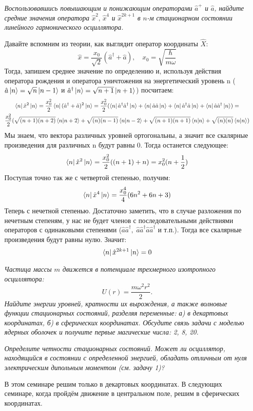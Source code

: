 \begin{center}
    \textit{Воспользовавшись повышающим и понижающим операторами $\hat a^+$ и $\hat a$, найдите средние значения оператора $\hat x^2,\,
    \hat x^4$ и $\hat x^{2k+1}$ в $n$-м стационарном состоянии линейного гармонического осциллятора.}
\end{center}
Давайте вспомним из теории, как выглядит оператор координаты $\hat X$: 
\[
\hat x = \frac{x_0}{\sqrt{2}}(\hat a^{\dagger} + \hat a),\quad x_0 = \sqrt{\frac{\hbar}{m\omega}}
\]
Тогда, запишем среднее значение по определению и, используя действия оператора рождения и оператора уничтожения на энергетический уровень n ($\hat a\ket{n} = \sqrt{n}\ket{n-1}$ и $\hat{a}^{\dagger}\ket{n} = \sqrt{n+1}\ket{n+1}$) посчитаем:
\begin{multline*}
    \bra{n}\hat x^2 \ket{n} = \frac{x^2_0}{2}\bra{n}(\hat a^{\dagger} + \hat a)^2\ket{n} = \frac{x^2_0}{2}(\bra{n}\hat a^{\dagger}\hat a^{\dagger}\ket{n} +\bra{n}\hat a\hat a\ket{n} + \bra{n}\hat a^{\dagger}\hat a\ket{n} + \bra{n}\hat a\hat a^{\dagger}\ket{n}) =\\
    \frac{x^2_0}{2}(\sqrt{(n+1)(n+2)}\bra{n}\ket{n+2} + \sqrt{(n)(n-1)}\bra{n}\ket{n-2} + \sqrt{(n+1)(n+1)}\bra{n}\ket{n} + \sqrt{(n) (n)}\bra{n}\ket{n})
\end{multline*}
Мы знаем, что вектора различных уровней ортогональны, а значит все скалярные произведения для различных n будут равны 0. Тогда останется следующее:
\[
\bra{n}\hat x^2\ket{n} = \frac{x^2_0}{2}((n+1) + n) = x^2_0(n + \frac{1}{2})
\]
Поступая точно так же с четвертой степенью, получим:
\[
\bra{n}\hat x^4\ket{n} = \frac{x_0^4}{4}(6n^2 + 6n + 3)
\]
Теперь с нечетной степенью. Достаточно заметить, что в случае разложения по нечетным степеням, у нас не будет членов с последовательными действиями операторов с одинаковыми степенями ($\hat a\hat a^{\dagger},\; \hat a\hat a^{\dagger}\hat a\hat a^{\dagger}$ и т.п.). Тогда все скалярные произведения будут равны нулю. Значит: 
\[
\bra{n}\hat x^{2k+1}\ket{n} = 0
\]
\begin{center}
    \textit{Частица массы $m$ движется в потенциале трехмерного изотропного осциллятора:}
    \[
    U(r) = \frac{m\omega^2r^2}{2}.
    \]
    \textit{Найдите энергии уровней, кратности их вырождения, а также волновые функции стационарных состояний, разделяя переменные: а) в декартовых координатах, б) в сферических координатах. Обсудите связь задачи с моделью ядерных оболочек и получите первые магические числа: 2, 8, 20.}

    \textit{Определите четности стационарных состояний. Может ли осциллятор, находящийся в состоянии с определенной энергией, обладать отличным от нуля электрическим дипольным моментом (см. задачу 1)?}
\end{center}
В этом семинаре решим только в декартовых координатах. В следующих семинаре, когда пройдём движение в центральном поле, решим в сферических координатах.

